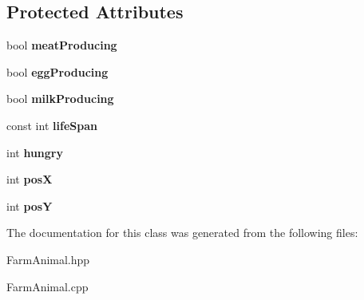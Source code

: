 \subsection*{Protected Attributes}
\begin{DoxyCompactItemize}
\item 
\mbox{\label{class_farm_animal_a46bff291c4be00046369e596844040e7}} 
bool {\bfseries meat\+Producing}
\item 
\mbox{\label{class_farm_animal_af2363ce3901574a4a7b1ea586d91ed25}} 
bool {\bfseries egg\+Producing}
\item 
\mbox{\label{class_farm_animal_aafa95a1db0a0bd05bcbff1404fe1a85f}} 
bool {\bfseries milk\+Producing}
\item 
\mbox{\label{class_farm_animal_a5e5935aa2ee0fd7f5ffa301131b50248}} 
const int {\bfseries life\+Span}
\item 
\mbox{\label{class_farm_animal_aecc9768db1749855adc1f764f0aedc44}} 
int {\bfseries hungry}
\item 
\mbox{\label{class_farm_animal_a56771cd28e67eb849418ea4989a97235}} 
int {\bfseries posX}
\item 
\mbox{\label{class_farm_animal_a32659b456e47701e526d9df4fae1d682}} 
int {\bfseries posY}
\end{DoxyCompactItemize}


The documentation for this class was generated from the following files\+:\begin{DoxyCompactItemize}
\item 
Farm\+Animal.\+hpp\item 
Farm\+Animal.\+cpp\end{DoxyCompactItemize}
